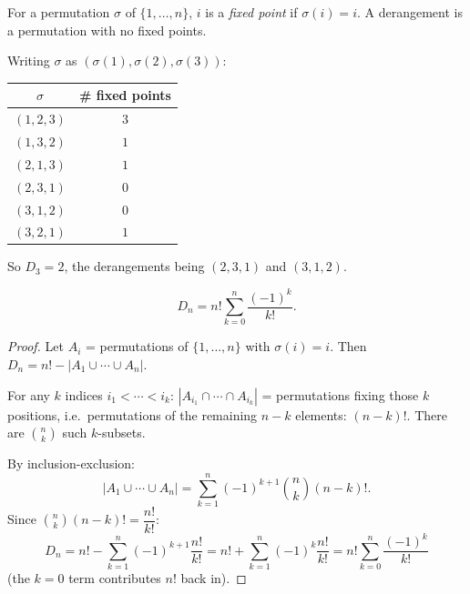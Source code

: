 \documentclass[11pt]{article}
\begin{document}
\begin{definition}
For a permutation $\sigma$ of $\{1,\dots,n\}$, $i$ is a \emph{fixed point} if $\sigma(i)=i$. A derangement is a permutation with no fixed points.
\end{definition}

\begin{example}[Permutations of $\{1,2,3\}$, CS70]
Writing $\sigma$ as $(\sigma(1),\sigma(2),\sigma(3))$:
\begin{center}
\begin{tabular}{c|c}
$\sigma$ & \# fixed points \\ \hline
$(1,2,3)$ & $3$ \\
$(1,3,2)$ & $1$ \\
$(2,1,3)$ & $1$ \\
$(2,3,1)$ & $0$ \\
$(3,1,2)$ & $0$ \\
$(3,2,1)$ & $1$
\end{tabular}
\end{center}
So $D_3=2$, the derangements being $(2,3,1)$ and $(3,1,2)$.
\end{example}

\begin{theorem}
\label{thm:derangecount}
\[
D_n = n!\sum_{k=0}^n \frac{(-1)^k}{k!}.
\]
\end{theorem}
\begin{proof}
Let $A_i$ = permutations of $\{1,\dots,n\}$ with $\sigma(i)=i$. Then $D_n = n! - |A_1\cup\cdots\cup A_n|$.

For any $k$ indices $i_1<\cdots<i_k$: $|A_{i_1}\cap\cdots\cap A_{i_k}|$ = permutations fixing those $k$ positions, i.e.\ permutations of the remaining $n-k$ elements: $(n-k)!$. There are $\binom{n}{k}$ such $k$-subsets.

By inclusion-exclusion:
\[
|A_1\cup\cdots\cup A_n| = \sum_{k=1}^n (-1)^{k+1}\binom{n}{k}(n-k)!.
\]
Since $\binom{n}{k}(n-k)! = \dfrac{n!}{k!}$:
\[
D_n = n! - \sum_{k=1}^n (-1)^{k+1}\frac{n!}{k!} = n! + \sum_{k=1}^n (-1)^k\frac{n!}{k!} = n!\sum_{k=0}^n \frac{(-1)^k}{k!}
\]
(the $k=0$ term contributes $n!$ back in).
\end{proof}
\end{document}
